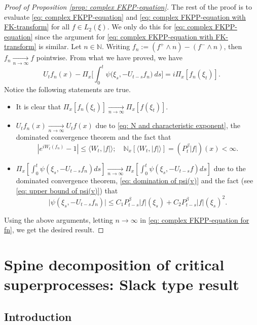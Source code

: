 \documentclass[UTF8]{pkuthss}
\theoremstyle{plain}
\theoremstyle{definition}
\numberwithin{equation}{section}
\begin{document}
\begin{proof}[Proof of Proposition \ref{prop: complex FKPP-equation}]
    The rest of the proof is to evaluate \eqref{eq: complex FKPP-equation} and \eqref{eq: complex FKPP-equation with FK-transform} for all $f\in L_2(\xi)$. We only do this for \eqref{eq: complex FKPP-equation} since the argument for \eqref{eq: complex FKPP-equation with FK-transform} is similar.
    Let $n \in \mathbb N$.
    Writing $f_n := (f^+ \wedge n) - (f^- \wedge n)$, then $f_n \xrightarrow[n\to \infty]{} f$ pointwise.
    From what we have proved, we have
\begin{equation}
\label{eq: complex FKPP-equation for fn}
    U_tf_n(x) - \Pi_{x} \Big[\int_0^t \psi\big(\xi_s, - U_{t-s}f_n\big) ~ds\Big]
    = i \Pi_{x} [f_n(\xi_t)].
\end{equation}
    Notice the following statements are true.
\begin{itemize}
\item
    It is clear that $\Pi_{x}[f_n(\xi_t)] \xrightarrow[n\to \infty]{} \Pi_{x}[f(\xi_t)]$.
\item
    $U_tf_n(x) \xrightarrow[n\to \infty]{} U_tf(x)$ due to \eqref{eq: N and characteristic exponent}, the dominated convergence theorem and the fact that
\[
    |e^{i W_t(f_n)} - 1| \leq \langle W_t, |f|\rangle;
    \quad \mathbb N_x[\langle W_t, |f|\rangle] = (P_t^{\beta} |f|)(x) < \infty.
\]
\item
    $\Pi_{x} [\int_0^t \psi(\xi_s,- U_{t-s}f_n)ds] \xrightarrow[n\to \infty]{} \Pi_{x} [\int_0^t \psi(\xi_s,- U_{t-s}f)ds]$ due to the dominated convergence theorem, \eqref{eq: domination of psi(v)} and the fact (see \eqref{eq: upper bound of psi(v)}) that
\begin{equation}
    \big|\psi(\xi_s,- U_{t-s}f_n)\big|
    \leq C_1 P_{t-s}^{\beta}|f|(\xi_s)+C_2 P_{t-s}^{\beta}|f|(\xi_s)^2.
\end{equation}
\end{itemize}
    Using the above arguments, letting $n \to \infty$ in \eqref{eq: complex FKPP-equation for fn}, we get the desired result.
\end{proof}

\chapter{Spine decomposition of critical superprocesses: Slack type result}
\section{Introduction}
\end{document}

